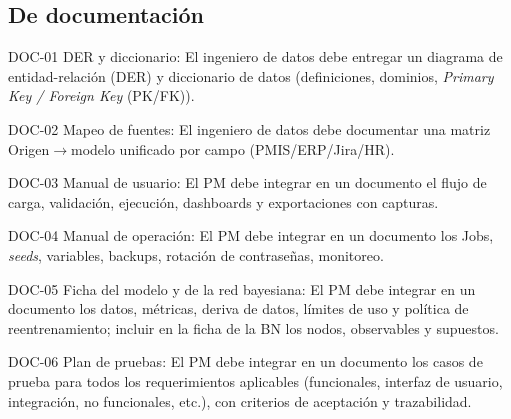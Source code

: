 \documentclass[12pt]
{charter}
\begin{document}
\subsection{De documentación}
\begin{description}
  \item DOC-01 DER y diccionario: El ingeniero de datos debe entregar un diagrama de entidad-relación (DER) y diccionario de datos (definiciones, dominios, \textit{Primary Key / Foreign Key} (PK/FK)).

  \item DOC-02 Mapeo de fuentes: El ingeniero de datos debe documentar una matriz Origen$\rightarrow$modelo unificado por campo (PMIS/ERP/Jira/HR).

  \item DOC-03 Manual de usuario: El PM debe integrar en un documento el flujo de carga, validación, ejecución, dashboards y exportaciones con capturas.

  \item DOC-04 Manual de operación: El PM debe integrar en un documento los Jobs, \textit{seeds}, variables, backups, rotación de contraseñas, monitoreo.

  \item DOC-05 Ficha del modelo y de la red bayesiana: El PM debe integrar en un documento los datos, métricas, deriva de datos, límites de uso y política de reentrenamiento; incluir en la ficha de la BN los nodos, observables y supuestos.

  \item DOC-06 Plan de pruebas: El PM debe integrar en un documento los casos de prueba para todos los requerimientos aplicables (funcionales, interfaz de usuario, integración, no funcionales, etc.), con criterios de aceptación y trazabilidad.

\end{description}
\end{document}
